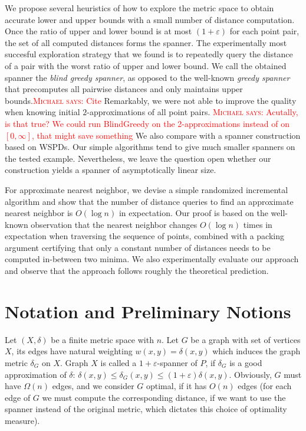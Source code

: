 \documentclass[a4paper,USenglish]{socg-lipics-v2018}
\newcommand{\eps}{\varepsilon}
\newcommand{\dist}{\delta}
\def\marrow{\marginpar[\hfill$\longrightarrow$]{$\longleftarrow$}}
\def\michael#1{\textcolor{red}{\textsc{Michael says: }{\marrow\sf #1}}}
\begin{document}
We propose several heuristics of how to explore the metric space to obtain accurate lower and upper bounds
with a small number of distance computation. Once the ratio of upper and lower bound is at most $(1+\eps)$
for each point pair, the set of all computed distances forms the spanner.
The experimentally most succesful exploration strategy that we found is to
repeatedly query the distance of a pair with the worst ratio of upper and lower bound.
We call the obtained spanner the \emph{blind greedy spanner}, as opposed to the well-known
\emph{greedy spanner} that precomputes all pairwise distances and only maintains upper bounds.\michael{Cite}
Remarkably, we were not able to improve the quality when knowing initial $2$-approximations of all point pairs.
\michael{Acutally, is that true? We could run BlindGreedy on the 2-approximations instead of on $[0,\infty]$,
that might save something}
We also compare with a spanner construction based on WSPDs. Our simple algorithms tend to give much smaller
spanners on the tested example. Nevertheless, we leave the question open whether our construction
yields a spanner of asymptotically linear size.

For approximate nearest neighbor, we devise a simple randomized incremental algorithm and show that
the number of distance queries to find an approximate nearest neighbor is $O(\log n)$ in expectation.
Our proof is based on the well-known observation that the nearest neighbor changes $O(\log n)$ times
in expectation when traversing the sequence of points, combined with a packing argument certifying that
only a constant number of distances needs to be computed in-between two minima.
We also experimentally evaluate our approach and observe that the approach follows 
roughly the theoretical prediction.



\section{Notation and Preliminary Notions}
Let $(X, \dist)$ be a finite metric space with $n$. Let $G$ be a graph with set of vertices $X$,
its edges have natural weighting $w(x,y) = \dist(x, y)$ which induces the graph metric $\dist_G$ on $X$.
Graph $X$ is called a $1 + \eps$-spanner of $P$, if $\dist_G$ is a good approximation of $\dist$:
$\dist(x,y) \leq \dist_G(x, y) \leq (1+\eps) \dist(x, y)$. Obviously, $G$ must have $\Omega(n)$ edges,
and we consider $G$ optimal, if it has $O(n)$ edges (for each edge of $G$ we must compute the corresponding
distance, if we want to use the spanner instead of the original metric, which dictates this
choice of optimality measure). 
\end{document}
